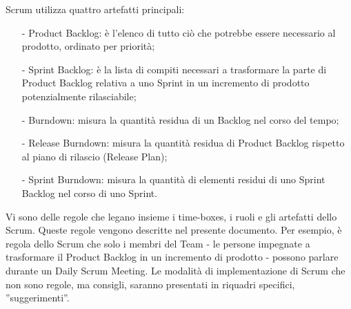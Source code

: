 Scrum  utilizza  quattro artefatti principali:\begin{itemize}
\item[-] Product Backlog: \`e l'elenco di tutto ci\`o che potrebbe essere necessario al prodotto, ordinato per
priorit\`a;
\item[-] Sprint Backlog: \`e la lista di compiti necessari a trasformare la parte di Product Backlog relativa a uno
Sprint in un incremento di prodotto potenzialmente rilasciabile;
\item[-] Burndown:  misura la quantit\`a residua di un Backlog nel corso del tempo;
\item[-] Release Burndown: misura la quantit\`a residua di Product Backlog rispetto al piano di rilascio (Release Plan);
\item[-] Sprint Burndown: misura la quantit\`a  di elementi residui di uno Sprint Backlog
nel corso  di uno  Sprint.
\end{itemize}

Vi sono delle regole che legano insieme i time-boxes, i ruoli e gli artefatti dello Scrum. Queste regole vengono
descritte nel presente documento. Per esempio, \`e regola dello Scrum che solo i membri del Team - le persone impegnate
a trasformare il Product Backlog in un incremento di prodotto - possono parlare durante un Daily Scrum Meeting. Le
modalit\`a di implementazione di Scrum che non sono regole, ma consigli, saranno presentati in riquadri specifici,
''suggerimenti''.
\vspace{0.4cm}

